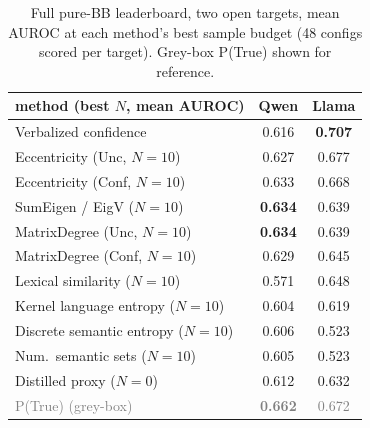 \documentclass[11pt]{article}
\newcommand{\best}[1]{\textbf{#1}}
\newcommand{\grey}[1]{\textcolor{gray}{#1}}
\begin{document}
\begin{table}[t]\centering\small
\setlength{\tabcolsep}{5pt}
\begin{tabular}{l cc}
\toprule
method (best $N$, mean AUROC) & Qwen & Llama\\
\midrule
Verbalized confidence         & 0.616 & \best{0.707}\\
Eccentricity (Unc, $N{=}10$)  & 0.627 & 0.677\\
Eccentricity (Conf, $N{=}10$) & 0.633 & 0.668\\
SumEigen / EigV ($N{=}10$)    & \best{0.634} & 0.639\\
MatrixDegree (Unc, $N{=}10$)  & \best{0.634} & 0.639\\
MatrixDegree (Conf, $N{=}10$) & 0.629 & 0.645\\
Lexical similarity ($N{=}10$) & 0.571 & 0.648\\
Kernel language entropy ($N{=}10$) & 0.604 & 0.619\\
Discrete semantic entropy ($N{=}10$) & 0.606 & 0.523\\
Num.\ semantic sets ($N{=}10$)& 0.605 & 0.523\\
Distilled proxy ($N{=}0$)     & 0.612 & 0.632\\
\grey{P(True) (grey-box)}     & \grey{\best{0.662}} & \grey{0.672}\\
\bottomrule
\end{tabular}
\caption{Full pure-BB leaderboard, two open targets, mean AUROC at each method's best
sample budget (48 configs scored per target). Grey-box P(True) shown for reference.}
\label{tab:app-open}
\end{table}
\end{document}
